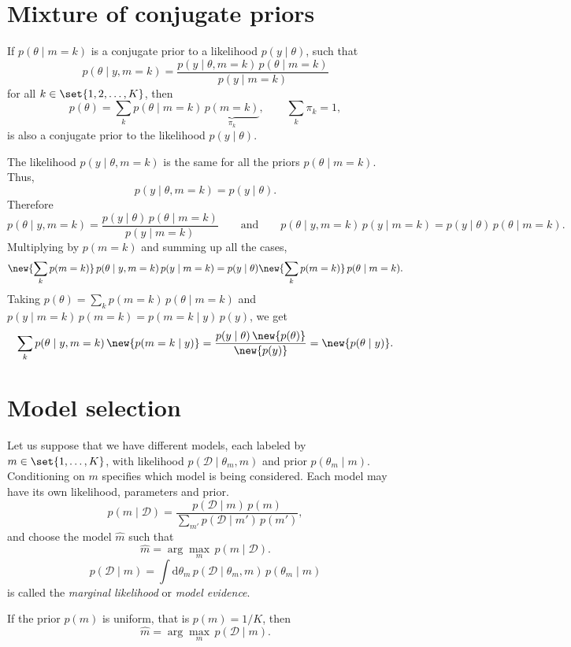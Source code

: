 \section{Mixture of conjugate priors}
If $p(\theta \mid m = k)$ is a conjugate prior to a likelihood $p(y \mid \theta)$, such that
\[
p(\theta \mid y, m = k) = \frac{p(y \mid \theta, m = k)\,p(\theta \mid m = k)}{p(y \mid m = k)}
\]
for all $k \in \set{1, 2, \dots, K}$, then
\[
p(\theta) = \sum_k p(\theta \mid m = k)\,\underbrace{p(m = k)}_{\pi_k}, \qquad \sum_k \pi_k = 1,
\]
is also a conjugate prior to the likelihood $p(y \mid \theta)$.

The likelihood $p(y \mid \theta, m = k)$ is the same for all the priors $p(\theta \mid m = k)$. Thus,
\[
p(y \mid \theta, m = k) = p(y \mid \theta).
\]
Therefore
\[
p(\theta \mid y, m = k) = \frac{p(y \mid \theta)\,p(\theta \mid m = k)}{p(y \mid m = k)}
\qquad\text{and}\qquad
p(\theta \mid y, m = k)\,p(y \mid m = k) = p(y \mid \theta)\,p(\theta \mid m = k).
\]
Multiplying by $p(m = k)$ and summing up all the cases,
\[
\new{\sum_k p(m = k)}\,p(\theta \mid y, m = k)\,p(y \mid m = k) = p(y \mid \theta)\new{\sum_k p(m = k)}\,p(\theta \mid m = k).
\]
Taking $p(\theta) = \sum_k p(m = k)\,p(\theta \mid m = k)$ and $p(y \mid m = k)\,p(m = k) = p(m = k \mid y)\,p(y)$, we get
\[
\sum_k p(\theta \mid y, m = k)\,\new{p(m = k \mid y)} = \frac{p(y \mid \theta)\,\new{p(\theta)}}{\new{p(y)}} = \new{p(\theta \mid y)}.
\]

\section{Model selection}
Let us suppose that we have different models, each labeled by $m \in \set{1, \dots, K}$, with likelihood $p(\mathcal{D} \mid \theta_m, m)$ and prior $p(\theta_m \mid m)$. Conditioning on $m$ specifies which model is being considered. Each model may have its own likelihood, parameters and prior.
\[
p(m \mid \mathcal{D}) = \frac{p(\mathcal{D} \mid m)\,p(m)}{\sum_{m'}p(\mathcal{D} \mid m')\,p(m')},
\]
and choose the model $\hat m$ such that
\[
\hat m = \arg\max_m\,p(m \mid \mathcal{D}).
\]
\[
p(\mathcal{D} \mid m) = \int \mathrm{d}\theta_m\,p(\mathcal{D} \mid \theta_m, m)\,p(\theta_m \mid m)
\]
is called the \emph{marginal likelihood} or \emph{model evidence}.

If the prior $p(m)$ is uniform, that is $p(m) = 1/K$, then
\[
\hat m = \arg\max_m\,p(\mathcal{D} \mid m).
\]

